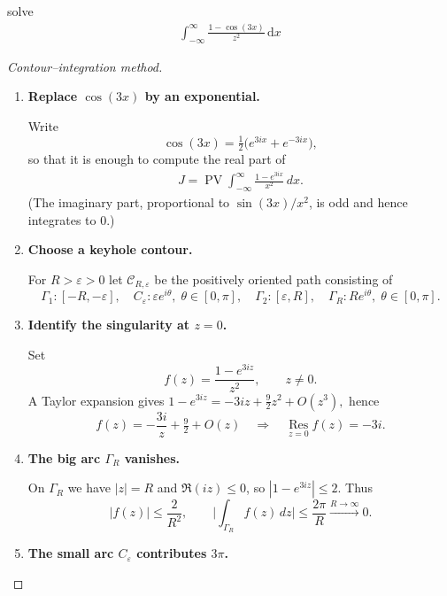 \documentclass[12pt]{article}
\theoremstyle{definition} %
\theoremstyle{plain} %
\begin{document}
solve 
\begin{align}
  \int_{-\infty}^{\infty} \frac{1-\cos(3x)}{z^{2}} \,\mathrm{d}x 
\end{align}
\begin{proof}[Contour–integration method]
  \begin{enumerate}[label=\textup{(\roman*)},nosep]
  
  \item \textbf{Replace $\cos(3x)$ by an exponential.}
  
  Write
  \[
      \cos(3x)=\tfrac12\!\bigl(e^{3ix}+e^{-3ix}\bigr),
  \]
  so that it is enough to compute the real part of
  \begin{align}
      J
      =\operatorname*{PV}\!\int_{-\infty}^{\infty}
        \frac{1-e^{3ix}}{x^{2}}\,dx .
  \end{align}
  (The imaginary part, proportional to $\sin(3x)/x^{2}$, is odd and
  hence integrates to $0$.)
  
  \item \textbf{Choose a keyhole contour.}
  
  For $R>\varepsilon>0$ let $\mathcal C_{R,\varepsilon}$ be the positively
  oriented path consisting of  
  \[
      \Gamma_1 : [-R,-\varepsilon],\quad
      C_\varepsilon : \varepsilon e^{i\theta},\; \theta\in[0,\pi],\quad
      \Gamma_2 : [\varepsilon,R],\quad
      \Gamma_R : R e^{i\theta},\; \theta\in[0,\pi].
  \]
  
  \item \textbf{Identify the singularity at $z=0$.}
  
  Set
  \[
      f(z)=\frac{1-e^{3iz}}{z^{2}},\qquad z\neq0.
  \]
  A Taylor expansion gives  
  \(
      1-e^{3iz}=-3iz+\tfrac92 z^{2}+O(z^{3}),
  \)
  hence
  \[
      f(z)=-\frac{3i}{z}+\tfrac92+O(z)
  \quad\Longrightarrow\quad
      \operatorname*{Res}_{z=0}f(z)=-3i .
  \]
  
  \item \textbf{The big arc $\Gamma_R$ vanishes.}
  
  On $\Gamma_R$ we have $|z|=R$ and $\Re(iz)\le0$, so
  $|1-e^{3iz}|\le2$.  Thus
  \[
      |f(z)|\le \frac{2}{R^{2}},\qquad
      \bigl|\!\int_{\Gamma_R}f(z)\,dz\bigr|\le \frac{2\pi}{R}\xrightarrow{R\to\infty}0 .
  \]
  
  \item \textbf{The small arc $C_\varepsilon$ contributes $3\pi$.}
  

\end{enumerate}
\end{proof}
\end{document}
